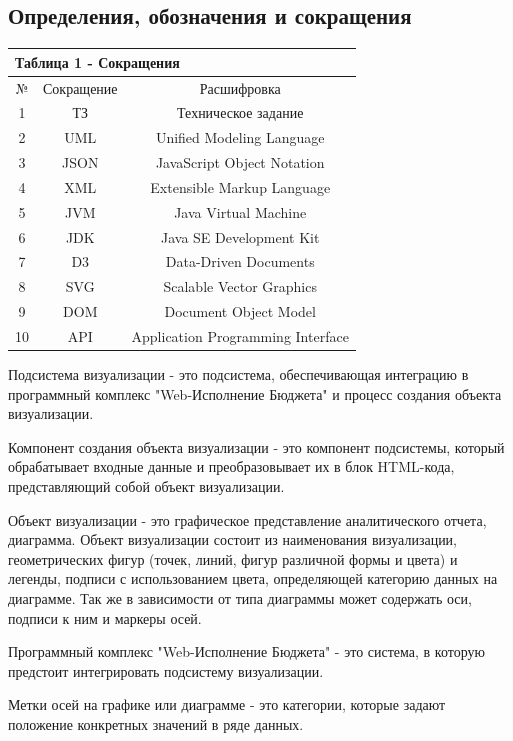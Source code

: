 \documentclass[a4paper]{extarticle}
\numberwithin{equation}{section}
\begin{document}
\subsection*{Определения, обозначения и сокращения}
\begin{table}[H]
  \begin{tabular}{|c|c|c|}
  \multicolumn{3}{l}{Таблица 1 - Сокращения} \\
  \hline
  №  & Сокращение & Расшифровка \\\hline
  1  & ТЗ   & Техническое задание \\\hline
  2  & UML  & Unified Modeling Language \\\hline
  3  & JSON & JavaScript Object Notation \\\hline
  4  & XML  & Extensible Markup Language \\\hline
  5  & JVM  & Java Virtual Machine \\\hline
  6  & JDK  & Java SE Development Kit \\\hline
  7  & D3   & Data-Driven Documents \\\hline
  8  & SVG  & Scalable Vector Graphics \\\hline
  9  & DOM  & Document Object Model \\\hline
  10 & API  & Application Programming Interface \\
  \hline
  \end{tabular}
\end{table}\par
Подсистема визуализации - это подсистема, обеспечивающая интеграцию в программный комплекс "Web-Исполнение Бюджета" и процесс создания объекта визуализации.\par
Компонент создания объекта визуализации - это компонент подсистемы, который обрабатывает входные данные и преобразовывает их в блок HTML-кода, представляющий собой объект визуализации.\par
Объект визуализации - это графическое представление аналитического отчета, диаграмма. Объект визуализации состоит из наименования визуализации, геометрических фигур (точек, линий, фигур различной формы и цвета) и легенды, подписи с использованием цвета, определяющей категорию данных на диаграмме. Так же в зависимости от типа диаграммы может содержать оси, подписи к ним и маркеры осей.\par
Программный комплекс "Web-Исполнение Бюджета" - это система, в которую предстоит интегрировать подсистему визуализации.\par
Метки осей на графике или диаграмме - это категории, которые задают положение конкретных значений в ряде данных.\par
\end{document}
